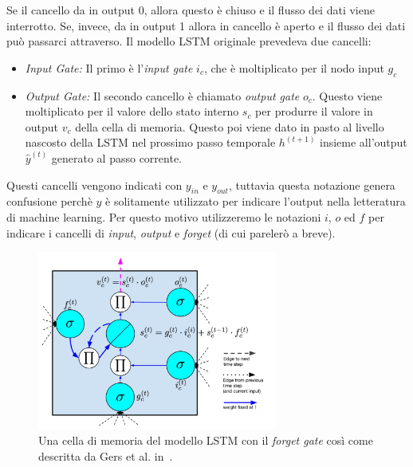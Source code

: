 \begin{itemize}
  Se il cancello da in output 0, allora questo \`e chiuso e il flusso dei dati viene interrotto.
  Se, invece, da in output 1 allora in cancello \`e aperto e il flusso dei dati pu\`o passarci attraverso.
  Il modello LSTM originale prevedeva due cancelli:
  \begin{itemize}
    \item \emph{Input Gate:} Il primo \`e l'\emph{input gate} $i_c$, che \`e moltiplicato per il nodo input $g_c$
    \item \emph{Output Gate:} Il secondo cancello \`e chiamato \emph{output gate} $o_c$.
    Questo viene moltiplicato per il valore dello stato interno $s_c$ per produrre il valore in output $v_c$ della cella di memoria.
    Questo poi viene dato in pasto al livello nascosto della LSTM nel prossimo passo temporale $h^{(t+1)}$ insieme all'output $\hat{y}^(t)$ generato al passo corrente.
  \end{itemize}
  Questi cancelli vengono indicati con $y_{in}$ e $y_{out}$, tuttavia questa notazione genera confusione perch\`e $y$ \`e solitamente utilizzato per indicare l'output nella letteratura di machine learning.
  Per questo motivo utilizzeremo le notazioni $i$, $o$ ed $f$ per indicare i cancelli di \emph{input}, \emph{output} e \emph{forget} (di cui pareler\`o a breve).
\end{itemize}

\begin{figure}[tp]
  \centering
  \begin{center}
    \includegraphics[width=0.7\textwidth]{./images/memoryCellWithForgetGate.png}
  \end{center}
  \caption{Una cella di memoria del modello LSTM con il \emph{forget gate} cos\`i come descritta da Gers et al. in~\cite{Gers:2000}.}
  \label{fig:memoryCellWithForgetGate}
\end{figure}

